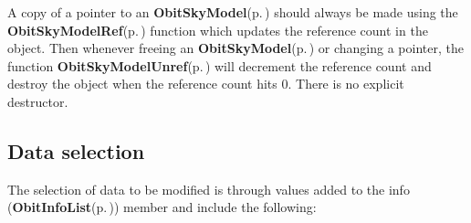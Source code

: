 A copy of a pointer to an {\bf Obit\-Sky\-Model}{\rm (p.\,\pageref{structObitSkyModel})} should always be made using the {\bf Obit\-Sky\-Model\-Ref}{\rm (p.\,\pageref{ObitSkyModel_8h_a1})} function which updates the reference count in the object. Then whenever freeing an {\bf Obit\-Sky\-Model}{\rm (p.\,\pageref{structObitSkyModel})} or changing a pointer, the function {\bf Obit\-Sky\-Model\-Unref}{\rm (p.\,\pageref{ObitSkyModel_8h_a0})} will decrement the reference count and destroy the object when the reference count hits 0. There is no explicit destructor.\subsection{Data selection}\label{ObitSkyModel_8h_ObitSkyModelselect}
The selection of data to be modified is through values added to the info ({\bf Obit\-Info\-List}{\rm (p.\,\pageref{structObitInfoList})}) member and include the following: \begin{itemize}

\end{itemize}
